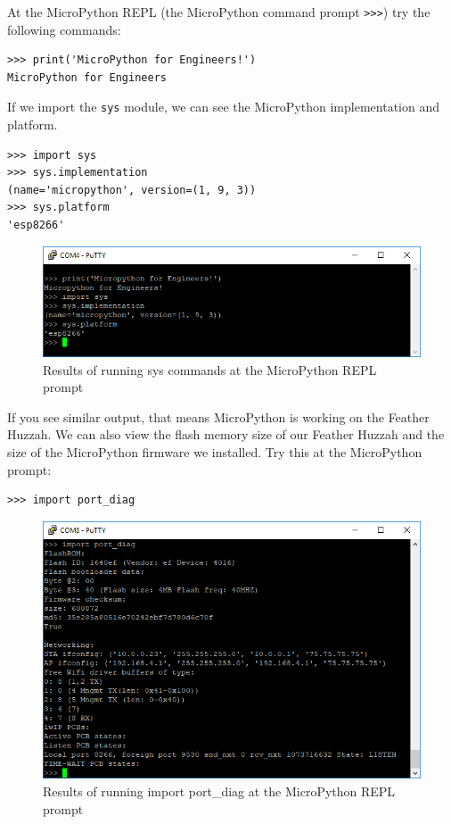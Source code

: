 \documentclass{book}
\makeatletter
\def\maxwidth{\ifdim\Gin@nat@width>\linewidth\linewidth
    \else\Gin@nat@width\fi}
\let\Oldincludegraphics\includegraphics
\renewcommand{\includegraphics}[1]{\Oldincludegraphics[width=.8\maxwidth]{#1}}
\makeatother
\begin{document}
    
        At the MicroPython REPL (the MicroPython command prompt \lstinline!>>>!)
try the following commands:

\begin{lstlisting}
>>> print('MicroPython for Engineers!')
MicroPython for Engineers
\end{lstlisting}

If we import the \lstinline!sys! module, we can see the MicroPython
implementation and platform.

\begin{lstlisting}
>>> import sys
>>> sys.implementation
(name='micropython', version=(1, 9, 3))
>>> sys.platform
'esp8266'
\end{lstlisting}

\begin{figure}
\centering
\includegraphics{images/sys_dot_implementation_and_platform.PNG}
\caption{Results of running sys commands at the MicroPython REPL prompt}
\end{figure}

If you see similar output, that means MicroPython is working on the
Feather Huzzah. We can also view the flash memory size of our Feather
Huzzah and the size of the MicroPython firmware we installed. Try this
at the MicroPython prompt:

\begin{lstlisting}
>>> import port_diag
\end{lstlisting}

\begin{figure}
\centering
\includegraphics{images/import_port_diag.PNG}
\caption{Results of running import port\_diag at the MicroPython REPL
prompt}
\end{figure}
\end{document}
